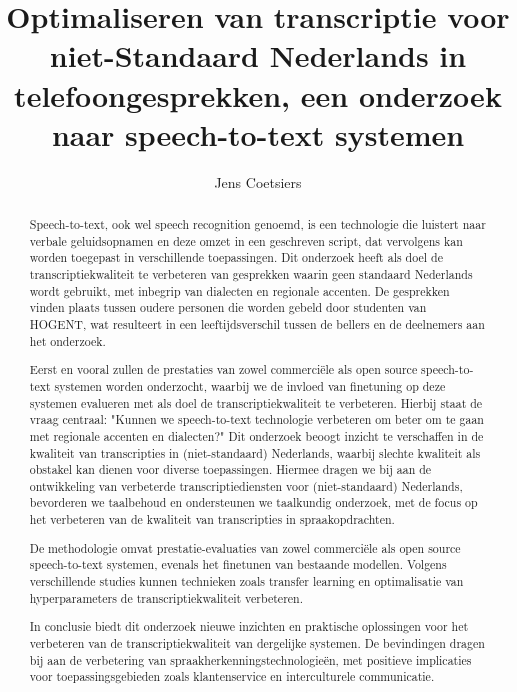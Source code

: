 \documentclass{hogent-article}
\title{Optimaliseren van transcriptie voor niet-Standaard Nederlands in telefoongesprekken, een onderzoek naar speech-to-text systemen}
\author{Jens Coetsiers}
\begin{document}
\begin{abstract}
Speech-to-text, ook wel speech recognition genoemd, is een technologie die luistert naar verbale geluidsopnamen en deze omzet in een geschreven script, dat vervolgens kan worden toegepast in verschillende toepassingen. Dit onderzoek heeft als doel de transcriptiekwaliteit te verbeteren van gesprekken waarin geen standaard Nederlands wordt gebruikt, met inbegrip van dialecten en regionale accenten. De gesprekken vinden plaats tussen oudere personen die worden gebeld door studenten van HOGENT, wat resulteert in een leeftijdsverschil tussen de bellers en de deelnemers aan het onderzoek.

Eerst en vooral zullen de prestaties van zowel commerciële als open source speech-to-text systemen worden onderzocht, waarbij we de invloed van finetuning op deze systemen evalueren met als doel de transcriptiekwaliteit te verbeteren. Hierbij staat de vraag centraal: "Kunnen we speech-to-text technologie verbeteren om beter om te gaan met regionale accenten en dialecten?" Dit onderzoek beoogt inzicht te verschaffen in de kwaliteit van transcripties in (niet-standaard) Nederlands, waarbij slechte kwaliteit als obstakel kan dienen voor diverse toepassingen. Hiermee dragen we bij aan de ontwikkeling van verbeterde transcriptiediensten voor (niet-standaard) Nederlands, bevorderen we taalbehoud en ondersteunen we taalkundig onderzoek, met de focus op het verbeteren van de kwaliteit van transcripties in spraakopdrachten.

De methodologie omvat prestatie-evaluaties van zowel commerciële als open source speech-to-text systemen, evenals het finetunen van bestaande modellen. Volgens verschillende studies kunnen technieken zoals transfer learning en optimalisatie van hyperparameters de transcriptiekwaliteit verbeteren.

In conclusie biedt dit onderzoek nieuwe inzichten en praktische oplossingen voor het verbeteren van de transcriptiekwaliteit van dergelijke systemen. De bevindingen dragen bij aan de verbetering van spraakherkenningstechnologieën, met positieve implicaties voor toepassingsgebieden zoals klantenservice en interculturele communicatie.
\end{abstract}

\tableofcontents



\printbibliography[heading=bibintoc]
\end{document}
